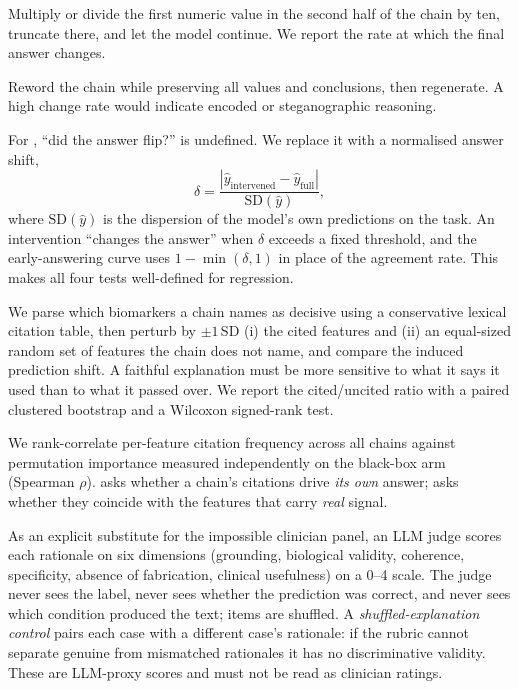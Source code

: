  Multiply or divide the first numeric value in the second half of the chain
by ten, truncate there, and let the model continue. We report the rate at which the final answer
changes.

 Reword the chain while preserving all values and conclusions, then regenerate.
A high change rate would indicate encoded or steganographic reasoning.

 For \tasktwo, ``did the answer flip?'' is undefined. We replace
it with a normalised answer shift,
\begin{equation}
    \delta = \frac{|\hat{y}_{\text{intervened}} - \hat{y}_{\text{full}}|}{\mathrm{SD}(\hat{y})},
    \label{eq:shift}
\end{equation}
where $\mathrm{SD}(\hat{y})$ is the dispersion of the model's own predictions on the task. An
intervention ``changes the answer'' when $\delta$ exceeds a fixed threshold, and the early-answering
curve uses $1-\min(\delta,1)$ in place of the agreement rate. This makes all four tests
well-defined for regression.

 We parse which biomarkers a chain names as decisive
using a conservative lexical citation table, then perturb by $\pm 1$\,SD (i) the cited features and
(ii) an equal-sized random set of features the chain does not name, and compare the induced
prediction shift. A faithful explanation must be more sensitive to what it says it used than to what
it passed over. We report the cited/uncited ratio with a paired clustered bootstrap and a Wilcoxon
signed-rank test.

 We rank-correlate per-feature citation frequency across
all chains against permutation importance measured independently on the black-box arm (Spearman
$\rho$). \cfit asks whether a chain's citations drive \emph{its own} answer; \esa asks whether they
coincide with the features that carry \emph{real} signal.

 As an explicit substitute for the impossible clinician panel, an
LLM judge scores each rationale on six dimensions (grounding, biological validity, coherence,
specificity, absence of fabrication, clinical usefulness) on a 0--4 scale. The judge never sees the
label, never sees whether the prediction was correct, and never sees which condition produced the
text; items are shuffled. A \emph{shuffled-explanation control} pairs each case with a different
case's rationale: if the rubric cannot separate genuine from mismatched rationales it has no
discriminative validity. These are LLM-proxy scores and must not be read as clinician ratings.

